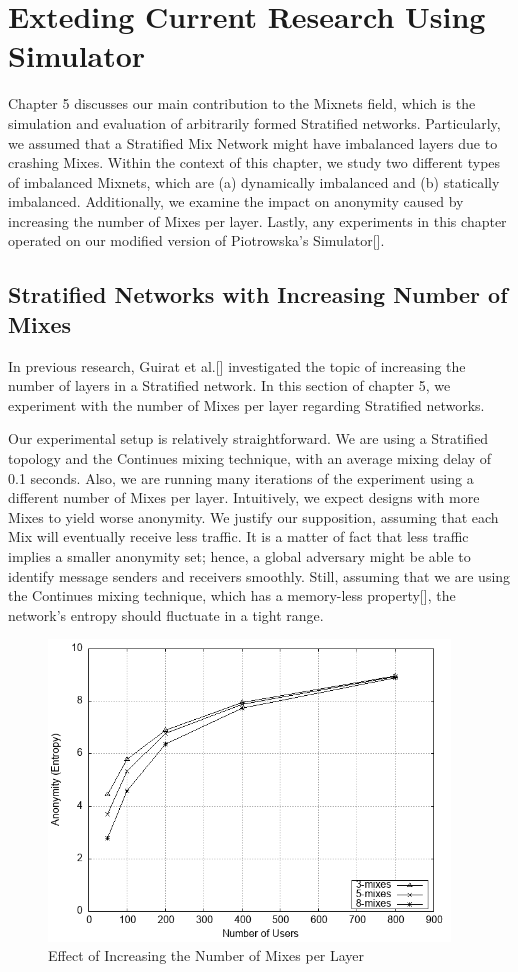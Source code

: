 \documentclass[logo,msc,cyber]{infthesis}   %
\begin{document}
\chapter{Exteding Current Research Using Simulator}
Chapter 5 discusses our main contribution to the Mixnets field, which is the
simulation and evaluation of arbitrarily formed Stratified networks.
Particularly, we assumed that a Stratified Mix Network might have imbalanced
layers due to crashing Mixes. Within the context of this chapter, we study two
different types of imbalanced Mixnets, which are (a) dynamically imbalanced and
(b) statically imbalanced. Additionally, we examine the impact on anonymity
caused by increasing the number of Mixes per layer. Lastly, any experiments in
this chapter operated on our modified version of Piotrowska's Simulator[].

\section{Stratified Networks with Increasing Number of Mixes}

In previous research, Guirat et al.[] investigated the topic of increasing the
number of layers in a Stratified network. In this section of chapter 5, we
experiment with the number of Mixes per layer regarding Stratified networks.

Our experimental setup is relatively straightforward. We are using a Stratified
topology and the Continues mixing technique, with an average mixing delay of 0.1
seconds. Also, we are running many iterations of the experiment using a
different number of Mixes per layer. Intuitively, we expect designs with more
Mixes to yield worse anonymity. We justify our supposition, assuming that each
Mix will eventually receive less traffic. It is a matter of fact that less
traffic implies a smaller anonymity set; hence, a global adversary might be able
to identify message senders and receivers smoothly. Still, assuming that we are
using the Continues mixing technique, which has a memory-less property[], the
network's entropy should fluctuate in a tight range.

\begin{figure}[h!]
    \centering
    \includegraphics[height=8cm]{figures/simulator_extentions/compare_layer_size.png}
    \caption{Effect of Increasing the Number of Mixes per Layer}
    \label{fig:stratified-incresing-number-of-mixes}
\end{figure}    
\end{document}
